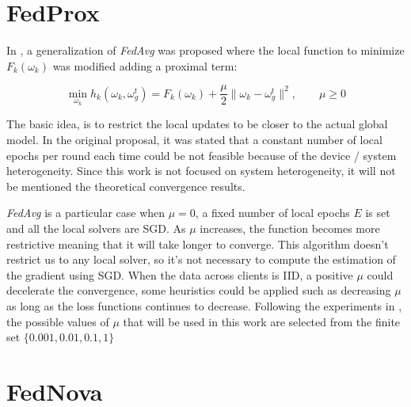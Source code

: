 \section{FedProx}

In \cite*{li2020}, a generalization of \textit{FedAvg} was proposed where the local function to minimize $F_k(\omega_k)$ was modified adding a proximal term:

\begin{equation}
  \min_{\omega_k} h_k (\omega_k, \omega_g^t) = F_k(\omega_k) + \frac{\mu}{2} \lVert \omega_k - \omega_g^t \rVert^2, \qquad \mu \geq 0
\end{equation}

The basic idea, is to restrict the local updates to be closer to the actual global model. In the original proposal, it was stated that a constant number of local epochs per round each time could be not feasible because of the device / system heterogeneity. Since this work is not focused on system heterogeneity, it will not be mentioned the theoretical convergence results.

\textit{FedAvg} is a particular case when $\mu = 0$, a fixed number of local epochs $E$ is set and all the local solvers are SGD. As $\mu$ increases, the function becomes more restrictive meaning that it will take longer to converge. This algorithm doesn't restrict us to any local solver, so it's not necessary to compute the estimation of the gradient using SGD.
When the data across clients is IID, a positive $\mu$ could decelerate the convergence, some heuristics could be applied such as decreasing $\mu$ as long as the loss functions continues to decrease. Following the experiments in \cite*{li2020}, the possible values of $\mu$ that will be used in this work are selected from the finite set $\{0.001, 0.01, 0.1, 1\}$

\section{FedNova}

